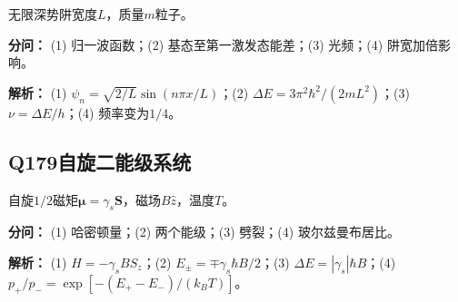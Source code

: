 无限深势阱宽度$L$，质量$m$粒子。

\par\textbf{分问：} (1) 归一波函数；(2) 基态至第一激发态能差；(3) 光频；(4) 阱宽加倍影响。

\par\textbf{解析：} (1) $\psi_n=\sqrt{2/L}\sin(n\pi x/L)$；(2) $\Delta E=3\pi^2\hbar^2/(2mL^2)$；(3) $\nu=\Delta E/h$；(4) 频率变为$1/4$。

\medskip

\subsection*{Q179\quad 自旋二能级系统}

自旋$1/2$磁矩$\boldsymbol\mu=\gamma_s\mathbf S$，磁场$B\hat z$，温度$T$。

\par\textbf{分问：} (1) 哈密顿量；(2) 两个能级；(3) 劈裂；(4) 玻尔兹曼布居比。

\par\textbf{解析：} (1) $H=-\gamma_sBS_z$；(2) $E_\pm=\mp\gamma_s\hbar B/2$；(3) $\Delta E=|\gamma_s|\hbar B$；(4) $p_+/p_-=\exp[-(E_+-E_-)/(k_BT)]$。

\medskip
